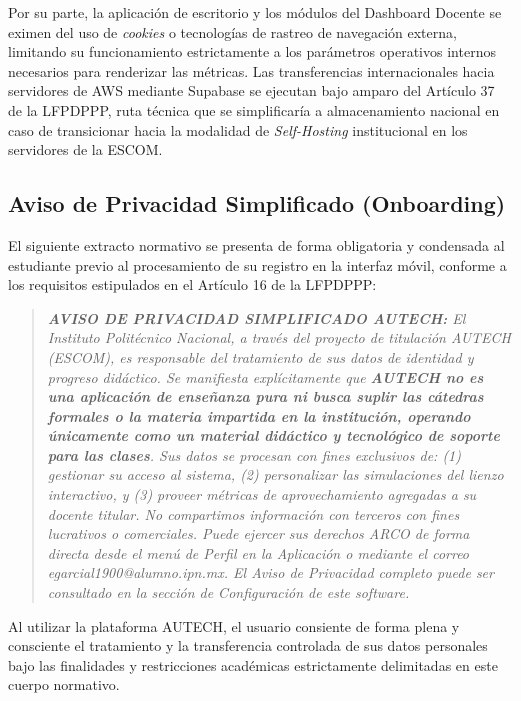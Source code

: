 Por su parte, la aplicación de escritorio y los módulos del Dashboard Docente se eximen del uso de \textit{cookies} o tecnologías de rastreo de navegación externa, limitando su funcionamiento estrictamente a los parámetros operativos internos necesarios para renderizar las métricas. Las transferencias internacionales hacia servidores de AWS mediante Supabase se ejecutan bajo amparo del Artículo 37 de la LFPDPPP, ruta técnica que se simplificaría a almacenamiento nacional en caso de transicionar hacia la modalidad de \textit{Self-Hosting} institucional en los servidores de la ESCOM.

\subsection{Aviso de Privacidad Simplificado (Onboarding)}
\label{subsec:privacidad_simplificado}

El siguiente extracto normativo se presenta de forma obligatoria y condensada al estudiante previo al procesamiento de su registro en la interfaz móvil, conforme a los requisitos estipulados en el Artículo 16 de la LFPDPPP:

\begin{quote}
    \small \textit{\textbf{AVISO DE PRIVACIDAD SIMPLIFICADO AUTECH:} El Instituto Politécnico Nacional, a través del proyecto de titulación AUTECH (ESCOM), es responsable del tratamiento de sus datos de identidad y progreso didáctico. Se manifiesta explícitamente que \textbf{AUTECH no es una aplicación de enseñanza pura ni busca suplir las cátedras formales o la materia impartida en la institución, operando únicamente como un material didáctico y tecnológico de soporte para las clases}. Sus datos se procesan con fines exclusivos de: (1) gestionar su acceso al sistema, (2) personalizar las simulaciones del lienzo interactivo, y (3) proveer métricas de aprovechamiento agregadas a su docente titular. No compartimos información con terceros con fines lucrativos o comerciales. Puede ejercer sus derechos ARCO de forma directa desde el menú de Perfil en la Aplicación o mediante el correo egarcial1900@alumno.ipn.mx. El Aviso de Privacidad completo puede ser consultado en la sección de Configuración de este software.}
\end{quote}

Al utilizar la plataforma AUTECH, el usuario consiente de forma plena y consciente el tratamiento y la transferencia controlada de sus datos personales bajo las finalidades y restricciones académicas estrictamente delimitadas en este cuerpo normativo.

